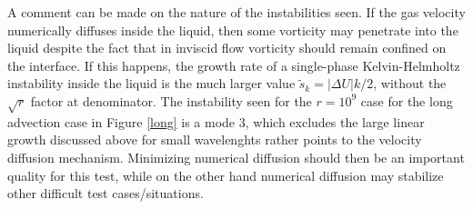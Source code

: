 A comment can be made on the nature of the instabilities seen. If
 the gas velocity numerically diffuses inside the liquid, then some vorticity
may penetrate into the liquid despite the fact that in inviscid flow
vorticity should remain confined on the interface. If this happens,
the growth rate of a single-phase Kelvin-Helmholtz instability inside the 
liquid is the much larger value $\widetilde{s}_k =| \Delta U | k/2$, 
without the $\sqrt r$ factor at denominator.  
The instability seen for the $r=10^9$ case for the long advection case in  Figure \ref{long} is 
a mode 3, which excludes the large linear growth discussed above for small 
wavelenghts rather points to the velocity diffusion mechanism. 
Minimizing numerical diffusion should then be an important
quality for this test, while on the other hand numerical diffusion may
stabilize other difficult test cases/situations. 


